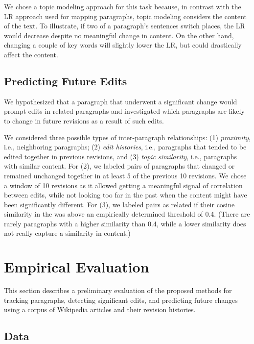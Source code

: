We chose a topic modeling approach for this task because, in contrast
with the LR approach used for mapping paragraphs, topic modeling
considers the content of the text. To illustrate, if two of a
paragraph's sentences switch places, the LR would decrease despite no
meaningful change in content. On the other hand, changing a couple of
key words will slightly lower the LR, but could drastically affect the
content.

\subsection{Predicting Future Edits}\label{predicting-future-edits}

We hypothesized that a paragraph that underwent a significant change
would prompt edits in related paragraphs and investigated which
paragraphs are likely to change in future revisions as a result of such
edits.

We considered three possible types of inter-paragraph relationships: (1)
\emph{proximity}, i.e., neighboring paragraphs; (2) \emph{edit
histories}, i.e., paragraphs that tended to be edited together in
previous revisions, and (3) \emph{topic similarity}, i.e., paragraphs
with similar content. For (2), we labeled pairs of paragraphs that
changed or remained unchanged together in at least 5 of the previous 10
revisions. We chose a window of 10 revisions as it allowed getting a
meaningful signal of correlation between edits, while not looking too
far in the past when the content might have been significantly
different. For (3), we labeled pairs as related if their cosine
similarity in the was above an empirically determined threshold of 0.4.
(There are rarely paragraphs with a higher similarity than 0.4, while a
lower similarity does not really capture a similarity in content.)

\section{Empirical Evaluation}\label{empirical-evaluation}

This section describes a preliminary evaluation of the proposed methods
for tracking paragraphs, detecting significant edits, and predicting
future changes using a corpus of Wikipedia articles and their revision
histories.

\subsection{Data}\label{data}

